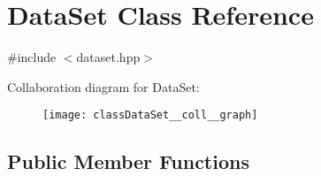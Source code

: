 \hypertarget{classDataSet}{}\section{Data\+Set Class Reference}
\label{classDataSet}


{\ttfamily \#include $<$dataset.\+hpp$>$}



Collaboration diagram for Data\+Set\+:
\nopagebreak
\begin{figure}[H]
\begin{center}
\leavevmode
\texttt{[image: classDataSet\_\_coll\_\_graph]}
\end{center}
\end{figure}
\subsection*{Public Member Functions}

